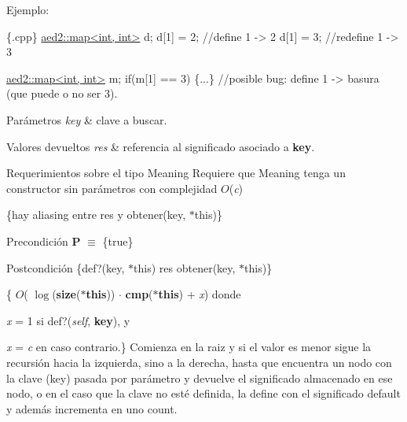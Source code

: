\-Ejemplo\-: 
\begin{DoxyCode}
 \{.cpp\}
 \hyperlink{classaed2_1_1map}{aed2::map<int, int>} d;
 d[1] = 2;      \textcolor{comment}{//define 1 -> 2}
 d[1] = 3;      \textcolor{comment}{//redefine 1 -> 3}

 \hyperlink{classaed2_1_1map}{aed2::map<int, int>} m;
 \textcolor{keywordflow}{if}(m[1] == 3) \{...\} \textcolor{comment}{//posible bug: define 1 -> basura (que puede o no ser 3).}
\end{DoxyCode}



\begin{DoxyParams}{\-Parámetros}
{\em key} & clave a buscar. \\
\hline
\end{DoxyParams}

\begin{DoxyRetVals}{\-Valores devueltos}
{\em res} & referencia al significado asociado a {\bfseries key}.\\
\hline
\end{DoxyRetVals}
\begin{DoxyParagraph}{\-Requerimientos sobre el tipo \-Meaning}
\-Requiere que \-Meaning tenga un constructor sin parámetros con complejidad $O$({\itshape c\/})
\end{DoxyParagraph}
\{hay aliasing entre res y obtener(key, $\ast$this)\}

\begin{DoxyPrecond}{\-Precondición}
{\bfseries \-P} $\equiv$ \{true\} 
\end{DoxyPrecond}
\begin{DoxyPostcond}{\-Postcondición}
\{def?(key, $\ast$this)  res  obtener(key, $\ast$this)\}
\end{DoxyPostcond}
\{ $O$( $\log$({\bfseries size}({\bfseries $\ast$this})) $\cdot$ {\bfseries cmp}({\bfseries $\ast$this}) + {\itshape x\/}) donde
\begin{DoxyItemize}
\item {\itshape x\/} = 1 si def?({\itshape self\/}, {\bfseries key}), y
\item {\itshape x\/} = {\itshape c\/} en caso contrario.\} \-Comienza en la raiz y si el valor es menor sigue la recursión hacia la izquierda, sino a la derecha, hasta que encuentra un nodo con la clave (key) pasada por parámetro y devuelve el significado almacenado en ese nodo, o en el caso que la clave no esté definida, la define con el significado default y además incrementa en uno count. 
\end{DoxyItemize}


